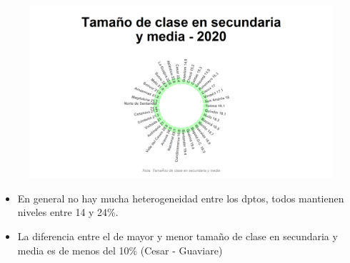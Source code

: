     \begin{figure}[H]
        \caption[Tamaño de clase en secundaria y media por departamentos para 2020 ]{\label{temano_sec_dpto_static} }
        \begin{center}
        \includegraphics[width=\textwidth,keepaspectratio]{img/var_230_static.png}
        \end{center}
    \end{figure}
            \begin{itemize}
                \item En general no hay mucha heterogeneidad entre los dptos, todos mantienen niveles entre 14 y 24\%.
                \item La diferencia entre el de mayor y menor tamaño de clase en secundaria y media es de menos del 10\% (Cesar - Guaviare)
                \end{itemize}

